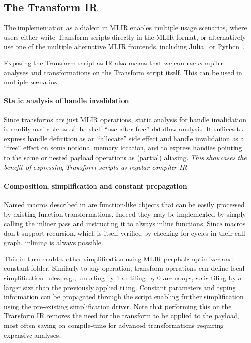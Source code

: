 \documentclass[screen,nonacm,authorversion]{acmart}
\begin{document}
\subsection{The Transform IR}
\label{sec:transform_ir_benefits}
The implementation as a dialect in MLIR
enables multiple usage scenarios, where users either write Transform scripts directly in the MLIR format, or alternatively use one of the multiple alternative MLIR frontends, including Julia~\cite{juliaMLIRFrontend} or Python~\cite{levental2023nelli}.

Exposing the Transform script as IR also means that we can use compiler analyses and transformations on the Transform script itself.
This can be used in multiple scenarios.













\paragraph{Static analysis of handle invalidation}
Since transforms are just MLIR operations, static analysis for handle invalidation is readily available as of-the-shelf ``use after free'' dataflow analysis. It suffices to express handle definition as an ``allocate'' side effect and handle invalidation as a ``free'' effect on some notional memory location, and to express handles pointing to the same or nested payload operations as (partial) aliasing. \emph{This showcases the benefit of expressing Transform scripts as regular compiler IR.}

\paragraph{Composition, simplification and constant propagation}
Named macros described in  are function-like objects that can be easily processed by existing function transformations. Indeed they may be implemented by simply calling the inliner pass and instructing it to always inline functions. Since macros don't support recursion, which is itself verified by checking for cycles in their call graph, inlining is always possible.

This in turn enables other simplification using MLIR peephole optimizer and constant folder. Similarly to any operation, transform operations can define local simplification rules, e.g., unrolling by 1 or tiling by 0 are noops, so is tiling by a larger size than the previously applied tiling. Constant parameters and typing information can be propagated through the script enabling further simplification using the pre-existing simplification driver. Note that performing this on the Transform IR removes the need for the transform to be applied to the payload, most often saving on compile-time for advanced transformations requiring expensive analyses.
\end{document}
